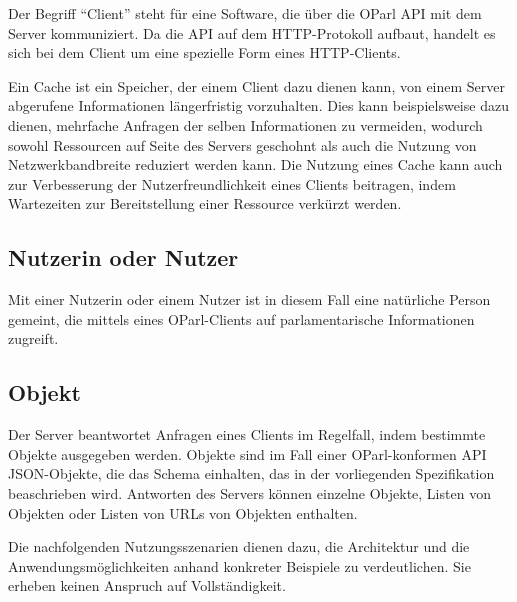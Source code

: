 \documentclass[,a4paper]{article}
\begin{document}
Der Begriff ``Client'' steht für eine Software, die über die OParl API
mit dem Server kommuniziert. Da die API auf dem HTTP-Protokoll aufbaut,
handelt es sich bei dem Client um eine spezielle Form eines
HTTP-Clients.


Ein Cache ist ein Speicher, der einem Client dazu dienen kann, von einem
Server abgerufene Informationen längerfristig vorzuhalten. Dies kann
beispielsweise dazu dienen, mehrfache Anfragen der selben Informationen
zu vermeiden, wodurch sowohl Ressourcen auf Seite des Servers geschohnt
als auch die Nutzung von Netzwerkbandbreite reduziert werden kann. Die
Nutzung eines Cache kann auch zur Verbesserung der Nutzerfreundlichkeit
eines Clients beitragen, indem Wartezeiten zur Bereitstellung einer
Ressource verkürzt werden.

\subsection{Nutzerin oder Nutzer}\label{nutzerin}

Mit einer Nutzerin oder einem Nutzer ist in diesem Fall eine natürliche
Person gemeint, die mittels eines OParl-Clients auf parlamentarische
Informationen zugreift.

\subsection{Objekt}\label{objekt}

Der Server beantwortet Anfragen eines Clients im Regelfall, indem
bestimmte Objekte ausgegeben werden. Objekte sind im Fall einer
OParl-konformen API JSON-Objekte, die das Schema einhalten, das in der
vorliegenden Spezifikation beaschrieben wird. Antworten des Servers
können einzelne Objekte, Listen von Objekten oder Listen von URLs von
Objekten enthalten.


Die nachfolgenden Nutzungsszenarien dienen dazu, die Architektur und die
Anwendungsmöglichkeiten anhand konkreter Beispiele zu verdeutlichen. Sie
erheben keinen Anspruch auf Vollständigkeit.
\end{document}

